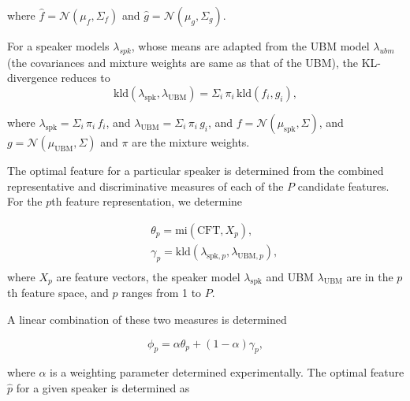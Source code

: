 \documentclass{article}
\begin{document}
where $\hat{f} = \mathcal{N}(\mu_f,\Sigma_f)$ and $\hat{g} = \mathcal{N}(\mu_g,\Sigma_g)$.

For a speaker models $\lambda_{spk}$, whose means are adapted from the UBM model
$\lambda_{ubm}$ (the covariances and mixture weights are same as that of the UBM), 
the KL-divergence reduces to 
\begin{equation}
\textrm{kld}(\lambda_{\textrm{spk}},\lambda_{\textrm{UBM}}) = 
	\Sigma_i\, \pi_i\, \textrm{kld}(f_i,g_i),
\label{eq:gmmAdaptedKLD}
\end{equation}


where $\lambda_{\textrm{spk}} = \Sigma_i \, \pi_i \, f_i$, and
$\lambda_{\textrm{UBM}} = \Sigma_i \, \pi_i \, g_i$, and
$f = \mathcal{N}(\mu_{\textrm{spk}},\Sigma)$, and
$g = \mathcal{N}(\mu_{\textrm{UBM}},\Sigma)$ and
$\pi$ are the mixture weights.


The optimal feature for a particular speaker is determined from the combined
representative and discriminative measures of each of the $P$ candidate
features. For the $p$th feature representation, we determine

\begin{eqnarray*}
&& \theta_p = \textrm{mi}(\textrm{CFT},X_{p}), \\
&& \gamma_p =
\textrm{kld}(\lambda_{\textrm{spk},p},\lambda_{\textrm{UBM},p}), \\
\end{eqnarray*} 
where $X_p$ are feature vectors, the speaker model $\lambda_{\textrm{spk}}$ and 
UBM $\lambda_{\textrm{UBM}}$ are in the $p$th feature space, and $p$ ranges from 1 to $P$.




A linear combination of these two measures is determined 

\begin{equation}
\phi_p = \alpha \theta_p  + (1-\alpha) \gamma_p,
\label{eq:phiFunc}
\end{equation}

where $\alpha$ is a weighting parameter determined experimentally. The optimal
feature $\hat{p}$ for a given speaker is determined as 
\end{document}
